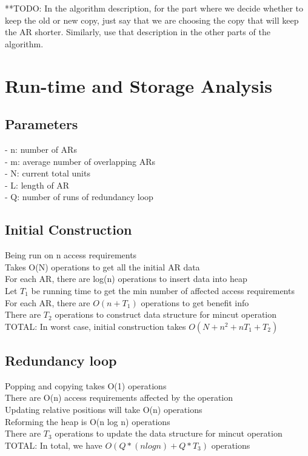 \documentclass[11pt,psfig]{article}
\begin{document}
**TODO: In the algorithm description, for the part where we decide whether to keep the old or new copy, just say that we are choosing the copy that will keep the AR shorter. Similarly, use that description in the other parts of the algorithm. 

\section*{Run-time and Storage Analysis}


\subsection*{Parameters}
- n: number of ARs\\
- m: average number of overlapping ARs\\
- N: current total units\\
- L: length of AR\\
- Q: number of runs of redundancy loop\\

\subsection*{Initial Construction}
	Being run on n access requirements\\
	Takes O(N) operations to get all the initial AR data\\
	For each AR, there are log(n) operations to insert data into heap\\
	Let $T_1$ be running time to get the min number of affected access requirements\\
	For each AR, there are $O(n + T_1)$ operations to get benefit info\\
	There are $T_2$ operations to construct data structure for mincut operation\\
	TOTAL: In worst case, initial construction takes $O(N + n^2 + n T_1 + T_2)$\\

\subsection*{Redundancy loop}
	Popping and copying takes O(1) operations\\
	There are O(n) access requirements affected by the operation\\
		Updating relative positions will take O(n) operations\\
	Reforming the heap is O(n log n) operations\\
	There are $T_3$ operations to update the data structure for mincut operation\\
	TOTAL: In total, we have $O(Q*(n log n) + Q*T_3)$ operations\\
\end{document}
